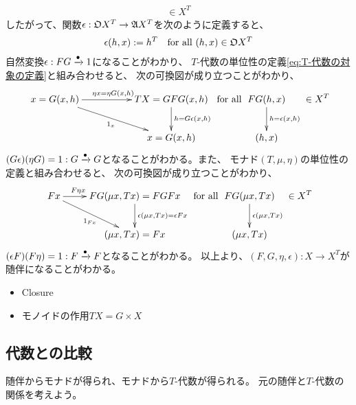 {\begin{equation*}
\begin{split}
{		}\in X^T
	\end{split}\end{equation*}
	したがって、関数$\epsilon:{\mathfrak{O}} X^T\to{\mathfrak{A}} X^T$を次のように定義すると、
	\begin{equation*}\begin{split}
		\epsilon(h,x) := h^T \quad\text{for all } (h,x)\in{\mathfrak{O}} X^T
	\end{split}\end{equation*}
	自然変換$\epsilon:FG\xrightarrow[{}]{\bullet}1$になることがわかり、
	$T$-代数の単位性の定義\eqref{eq:T-代数の対象の定義}と組み合わせると、
	次の可換図が成り立つことがわかり、
	\begin{equation*}\begin{split}
		\xymatrix@C=12ex{
			x = G(x,h) \ar[r]^{\eta x = \eta G(x,h)} \ar[dr]_{1_x}
			& TX = GFG(x,h) \ar[d]^{h = G\epsilon(x,h)} \\
			& x = G(x,h) \\
		} \text{ for all }\xymatrix{
			FG(h,x) \ar[d]^{h = \epsilon(x,h)} \\ (h, x)
		}\in X^T
	\end{split}\end{equation*}
	$(G\epsilon)(\eta G)=1:G\xrightarrow[{}]{\bullet}G$となることがわかる。また、
	モナド$(T,\mu,\eta)$の単位性の定義と組み合わせると、
	次の可換図が成り立つことがわかり、
	\begin{equation*}\begin{split}
		\xymatrix{
			Fx \ar[r]^(.3){F\eta x} \ar[dr]_{1_{Fx}}
			& FG(\mu x, Tx) = FGFx \ar[d]^{\epsilon(\mu x,Tx) = \epsilon Fx} \\
			& (\mu x, Tx) = Fx \\
		} \text{ for all }\xymatrix{
			FG(\mu x,Tx) \ar[d]^{\epsilon(\mu x,Tx)} \\ (\mu x, Tx)
		}\in X^T
	\end{split}\end{equation*}
	$(\epsilon F)(F\eta)=1:F\xrightarrow[{}]{\bullet}F$となることがわかる。
	以上より、$(F,G,\eta,\epsilon):X\to X^T$が随伴になることがわかる。
\begin{todo}\label{todo:Eilenberg-Moore圏の例} %
	\begin{itemize}\setlength{\itemsep}{-1mm} %
		\item Closure
		\item モノイドの作用$TX=G\times X$
	\end{itemize} %
\end{todo} %
\subsection{代数との比較}\label{s2:代数との比較} %
	随伴からモナドが得られ、モナドから$T$-代数が得られる。
	元の随伴と$T$-代数の関係を考えよう。

}
